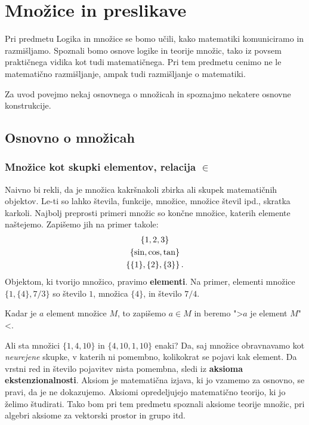 \chapter{Množice in preslikave}

Pri predmetu Logika in množice se bomo učili, kako matematiki komuniciramo in razmišljamo. Spoznali bomo osnove logike
in teorije množic, tako iz povsem praktičnega vidika kot tudi matematičnega. Pri tem predmetu cenimo ne le matematično
razmišljanje, ampak tudi razmišljanje o matematiki.

Za uvod povejmo nekaj osnovnega o množicah in spoznajmo nekatere osnovne konstrukcije.

\section{Osnovno o množicah}

\subsection{Množice kot skupki elementov, relacija $\in$}

Naivno bi rekli, da je množica kakršnakoli zbirka ali skupek matematičnih objektov. Le-ti so lahko števila, funkcije,
množice, množice števil ipd., skratka karkoli.
%
Najbolj preprosti primeri množic so končne množice, katerih elemente naštejemo. Zapišemo jih na primer takole:
%
\begin{gather*}
  \left\{1, 2, 3\right\} \\
  \left\{\sin, \cos, \tan\right\} \\
  \left\{\{1\}, \{2\}, \{3\}\right\}.
\end{gather*}
%
Objektom, ki tvorijo množico, pravimo \textbf{elementi}. Na primer, elementi množice $\{1, \{4\}, 7/3\}$ so število $1$, množica $\{4\}$, in število $7/4$.

Kadar je $a$ element množice $M$, to zapišemo $a \in M$ in beremo ">$a$ je element $M$"<.

Ali sta množici $\{1, 4, 10\}$ in $\{4, 10, 1, 10\}$ enaki? Da, saj množice obravnavamo kot \emph{neurejene} skupke, v katerih ni pomembno, kolikokrat se pojavi kak element. Da vrstni red in število pojavitev nista pomembna, sledi iz \textbf{aksioma
ekstenzionalnosti}. Aksiom je matematična izjava, ki jo vzamemo za osnovno, se pravi, da je ne dokazujemo. Aksiomi opredeljujejo matematično teorijo, ki jo želimo študirati. Tako bom pri tem predmetu spoznali aksiome teorije množic, pri algebri aksiome za vektorski prostor in grupo itd.

